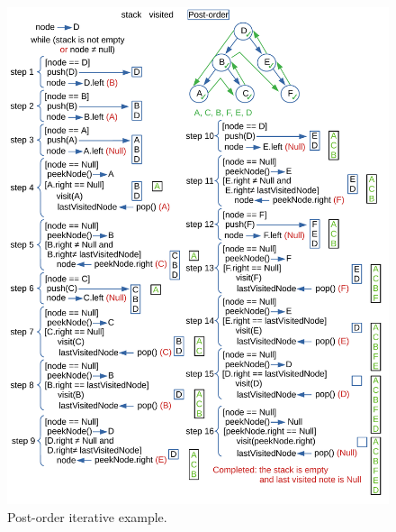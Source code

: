 \begin{figure}[H]
	\begin{center}
		\includegraphics[scale=.6]{chapters/appendix/images/appendixtree/treesappendix_3.pdf}
		\caption[Post-order iterative example.]{Post-order iterative example.}
		\label{appendixtrees_3}
	\end{center}
\end{figure}


